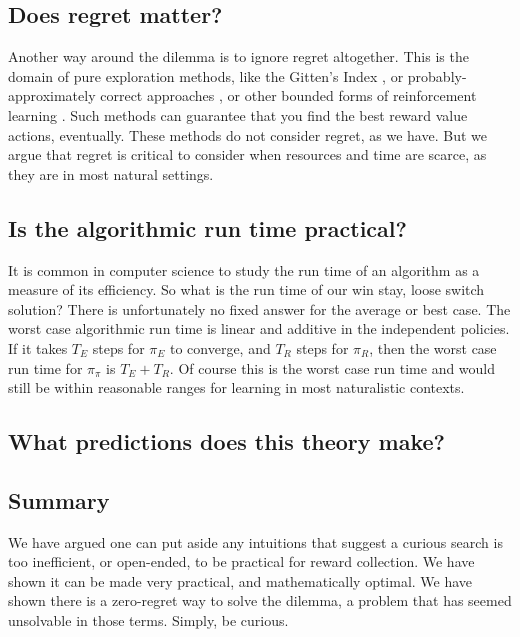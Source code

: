 \subsection*{Does regret matter?}
Another way around the dilemma is to ignore regret altogether. This is the domain of pure exploration methods, like the Gitten’s Index \citep{Gittins1979}, or probably-approximately correct approaches \citep{Valiant1984}, or other bounded forms of reinforcement learning \citep{Brafman2002}. Such methods can guarantee that you find the best reward value actions, eventually. These methods do not consider regret, as we have. But we argue that regret is critical to consider when resources and time are scarce, as they are in most natural settings. 


\subsection*{Is the algorithmic run time practical?}
It is common in computer science to study the run time of an algorithm as a measure of its efficiency. So what is the run time of our win stay, loose switch solution? There is unfortunately no fixed answer for the average or best case. The worst case algorithmic run time is linear and additive in the independent policies. If it takes $T_E$ steps for $\pi_E$ to converge, and $T_R$ steps for $\pi_R$, then the worst case run time for $\pi_{\pi}$ is $T_E + T_R$. Of course this is the worst case run time and would still be within reasonable ranges for learning in most naturalistic contexts.

\subsection*{What predictions does this theory make?}

\subsection*{Summary}
We have argued one can put aside any intuitions that suggest a curious search is too inefficient, or open-ended, to be practical for reward collection. We have shown it can be made very practical, and mathematically optimal. We have shown there is a zero-regret way to solve the dilemma, a problem that has seemed unsolvable in those terms. Simply, be curious.
